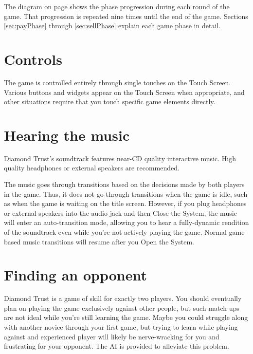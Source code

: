 \documentclass[8pt]{extbook}
\begin{document}
The diagram on page \pageref{fig:gameFlow} shows the phase progression during each round of the game.  That progression is repeated nine times until the end of the game.  Sections \ref{sec:payPhase} through \ref{sec:sellPhase} explain each game phase in detail.











\section{Controls}
The game is controlled entirely through single touches on the Touch Screen.  Various buttons and widgets appear on the Touch Screen when appropriate, and other situations require that you touch specific game elements directly.

\section{Hearing the music}

Diamond Trust's soundtrack features near-CD quality interactive music.  High quality headphones or external speakers are recommended.  

The music goes through transitions based on the decisions made by both players in the game.  Thus, it does not go through transitions when the game is idle, such as when the game is waiting on the title screen.  However, if you plug headphones or external speakers into the audio jack and then Close the System, the music will enter an auto-transition mode, allowing you to hear a fully-dynamic rendition of the soundtrack even while you're not actively playing the game.  Normal game-based music transitions will resume after you Open the System.

\section{Finding an opponent}

Diamond Trust is a game of skill for exactly two players.  You should eventually plan on playing the game exclusively against other people, but such match-ups are not ideal while you're still learning the game.  Maybe you could struggle along with another novice through your first game, but trying to learn while playing against and experienced player will likely be nerve-wracking for you and frustrating for your opponent.  The AI is provided to alleviate this problem.
\end{document}
